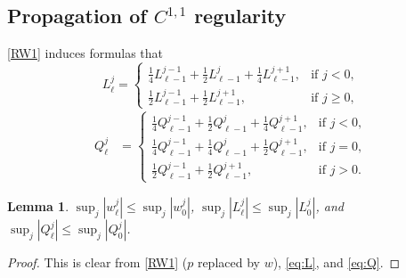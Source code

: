 \documentclass[a4paper,11pt]{article}
\def\l{{h}}
\def\Lip{{\mathrm{Lip}}}
\newtheorem{lemma}{Lemma}[section]
\theoremstyle{remark}
\begin{document}
\subsection{Propagation of $C^{1,1}$ regularity}
\eqref{RW1} induces formulas that 
\begin{equation} \label{eq:L}
L^j_\ell = \left\{\begin{array}{ll}
        \frac{1}{4}L_{\ell-1}^{j-1} + \frac{1}{2}L_{\ell-1}^j + \frac{1}{4}L_{\ell-1}^{j+1}, & \text{if $j<0$},\\
        \frac{1}{2}L_{\ell-1}^{j-1} + \frac{1}{2}L_{\ell-1}^{j+1}, & \text{if $j\ge0$},
        \end{array}\right.
\end{equation}
\begin{equation}\label{eq:Q}
\begin{aligned}
Q^j_\ell %
&=\left\{\begin{array}{ll}
        \frac{1}{4}Q_{\ell-1}^{j-1} + \frac{1}{2}Q_{\ell-1}^{j} + \frac{1}{4}Q_{\ell-1}^{j+1}, & \text{if $j<0$},\\
        \frac{1}{4}Q_{\ell-1}^{j-1} + \frac{1}{4}Q_{\ell-1}^{j} + \frac{1}{2}Q_{\ell-1}^{j+1}, & \text{if $j=0$},\\
        \frac{1}{2}Q_{\ell-1}^{j-1} + \frac{1}{2}Q_{\ell-1}^{j+1}, & \text{if $j>0$}.
        \end{array}\right.
 \end{aligned}
\end{equation}
\begin{lemma} \label{uniform_est}
 $ \displaystyle\sup _{j} |w^j_\ell| \le \sup _{j} |w^j_0|$, $ \displaystyle\sup _{j} |L^j_\ell| \le \sup _{j} |L^j_0|$, and $\displaystyle \sup _{j} |Q^j_\ell| \le \sup _{j} |Q^j_0|$.
\end{lemma}
\begin{proof}
 This is clear from \eqref{RW1} ($p$ replaced by $w$), \eqref{eq:L}, and \eqref{eq:Q}.
\end{proof}
% 
% 
\end{document}

